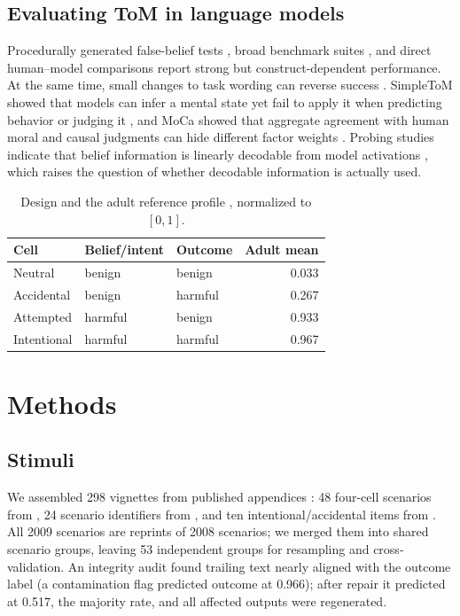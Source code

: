 \documentclass[10pt,letterpaper]{article}
\begin{document}
\subsection{Evaluating ToM in language models}
Procedurally generated false-belief tests \citep{gandhi2023bigtom}, broad benchmark suites \citep{chen2024tombench}, and direct human--model comparisons \citep{strachan2024testing} report strong but construct-dependent performance.
At the same time, small changes to task wording can reverse success \citep{ullman2023alterations,shapira2024clever}.
SimpleToM showed that models can infer a mental state yet fail to apply it when predicting behavior or judging it \citep{gu2026simpletom}, and MoCa showed that aggregate agreement with human moral and causal judgments can hide different factor weights \citep{nie2023moca}.
Probing studies indicate that belief information is linearly decodable from model activations \citep{zhu2024beliefs}, which raises the question of whether decodable information is actually used.

\begin{table}[t]
\centering
\small
\caption{Design and the adult reference profile \citep{young2007neural}, normalized to $[0,1]$.}
\label{tab:design}
\begin{tabular}{@{}lllr@{}}
\toprule
Cell & Belief/intent & Outcome & Adult mean \\
\midrule
Neutral & benign & benign & 0.033 \\
Accidental & benign & harmful & 0.267 \\
Attempted & harmful & benign & 0.933 \\
Intentional & harmful & harmful & 0.967 \\
\bottomrule
\end{tabular}
\end{table}

\section{Methods}

\subsection{Stimuli}
We assembled 298 vignettes from published appendices \citep{young2008belief,young2009innocent,young2011ignorance}: 48 four-cell scenarios from \citet{young2008belief}, 24 scenario identifiers from \citet{young2009innocent}, and ten intentional/accidental items from \citet{young2011ignorance}.
All 2009 scenarios are reprints of 2008 scenarios; we merged them into shared scenario groups, leaving 53 independent groups for resampling and cross-validation.
An integrity audit found trailing text nearly aligned with the outcome label (a contamination flag predicted outcome at 0.966); after repair it predicted at 0.517, the majority rate, and all affected outputs were regenerated.
\end{document}
